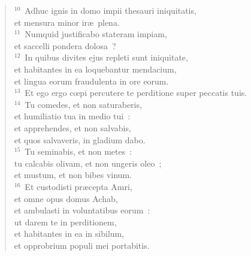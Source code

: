 \begin{verse}
${}^{10}$~Adhuc ignis in domo impii thesauri iniquitatis,\\ et mensura minor ir\ae\ plena.\\
${}^{11}$~Numquid justificabo stateram impiam,\\ et saccelli pondera dolosa~?\\
${}^{12}$~In quibus divites ejus repleti sunt iniquitate,\\ et habitantes in ea loquebantur mendacium,\\ et lingua eorum fraudulenta in ore eorum.\\
${}^{13}$~Et ego ergo cœpi percutere te perditione super peccatis tuis.\\
${}^{14}$~Tu comedes, et non saturaberis,\\ et humiliatio tua in medio tui~:\\ et apprehendes, et non salvabis,\\ et quos salvaveris, in gladium dabo.\\
${}^{15}$~Tu seminabis, et non metes~:\\ tu calcabis olivam, et non ungeris oleo~;\\ et mustum, et non bibes vinum.\\
${}^{16}$~Et custodisti pr\ae cepta Amri,\\ et omne opus domus Achab,\\ et ambulasti in voluntatibus eorum~:\\ ut darem te in perditionem,\\ et habitantes in ea in sibilum,\\ et opprobrium populi mei portabitis.\end{verse}


